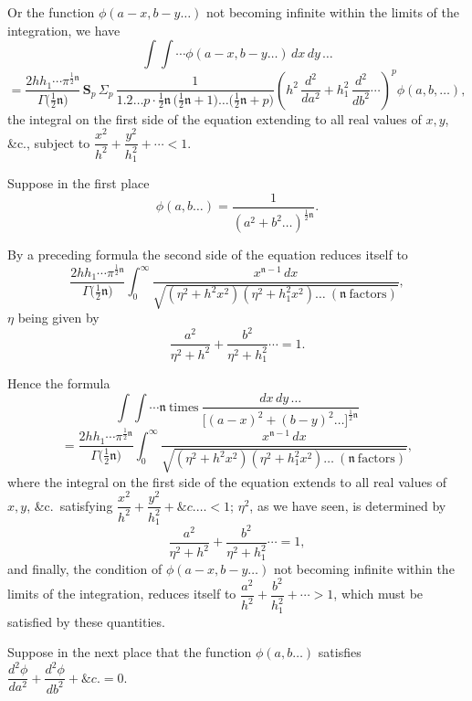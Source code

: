 \documentclass[11pt]{article}
\begin{document}
\clearpage

Or the function $\phi(a - x, b - y \ldots)$ not becoming infinite within the limits of the integration, we have
\[
\int\!\!\int \cdots \phi(a - x, b - y \ldots)\,dx\,dy\,\ldots
\]
\[
= \frac{2hh_{1}\cdots\pi^{\frac{1}{2}\mathfrak{n}}}{\Gamma\bigl(\tfrac{1}{2}\mathfrak{n}\bigr)}\,\boldsymbol{S}_{p}\,\Sigma_{p}\,\frac{1}{1.2\ldots p\cdot\tfrac{1}{2}\mathfrak{n}\,\bigl(\tfrac{1}{2}\mathfrak{n} + 1\bigr)\ldots\bigl(\tfrac{1}{2}\mathfrak{n} + p\bigr)}\left(h^{2}\,\frac{d^{2}}{da^{2}} + h_{1}^{2}\,\frac{d^{2}}{db^{2}}\cdots\right)^{p}\phi(a, b, \ldots),
\]
the integral on the first side of the equation extending to all real values of $x, y$, \&c., subject to $\dfrac{x^{2}}{h^{2}} + \dfrac{y^{2}}{h_{1}^{2}} + \cdots < 1$.

\medskip

Suppose in the first place
\[
\phi(a, b \ldots) = \frac{1}{(a^{2} + b^{2} \ldots)^{\frac{1}{2}\mathfrak{n}}}.
\]

By a preceding formula the second side of the equation reduces itself to
\[
\frac{2hh_{1}\cdots\pi^{\frac{1}{2}\mathfrak{n}}}{\Gamma\bigl(\tfrac{1}{2}\mathfrak{n}\bigr)}\int_{0}^{\infty}\frac{x^{\mathfrak{n} - 1}\,dx}{\sqrt{(\eta^{2} + h^{2}x^{2})(\eta^{2} + h_{1}^{2}x^{2})\ldots\ (\mathfrak{n}\ \text{factors})}},
\]
$\eta$ being given by
\[
\frac{a^{2}}{\eta^{2} + h^{2}} + \frac{b^{2}}{\eta^{2} + h_{1}^{2}}\cdots = 1.
\]

Hence the formula
\[
\int\!\!\int \cdots \mathfrak{n}\ \text{times}\ \frac{dx\,dy\,\ldots}{\bigl[(a - x)^{2} + (b - y)^{2}\ldots\bigr]^{\frac{1}{2}\mathfrak{n}}}
\]
\[
= \frac{2hh_{1}\cdots\pi^{\frac{1}{2}\mathfrak{n}}}{\Gamma\bigl(\tfrac{1}{2}\mathfrak{n}\bigr)}\int_{0}^{\infty}\frac{x^{\mathfrak{n} - 1}\,dx}{\sqrt{(\eta^{2} + h^{2}x^{2})(\eta^{2} + h_{1}^{2}x^{2})\ldots\ (\mathfrak{n}\ \text{factors})}},
\]
where the integral on the first side of the equation extends to all real values of $x, y$, \&c.\ satisfying $\dfrac{x^{2}}{h^{2}} + \dfrac{y^{2}}{h_{1}^{2}} + \&c.\ldots < 1$; $\eta^{2}$, as we have seen, is determined by
\[
\frac{a^{2}}{\eta^{2} + h^{2}} + \frac{b^{2}}{\eta^{2} + h_{1}^{2}}\cdots = 1,
\]
and finally, the condition of $\phi(a - x, b - y \ldots)$ not becoming infinite within the limits of the integration, reduces itself to $\dfrac{a^{2}}{h^{2}} + \dfrac{b^{2}}{h_{1}^{2}} + \cdots > 1$, which must be satisfied by these quantities.

\medskip

Suppose in the next place that the function $\phi(a, b \ldots)$ satisfies $\dfrac{d^{2}\phi}{da^{2}} + \dfrac{d^{2}\phi}{db^{2}} + \&c. = 0$.
\end{document}
